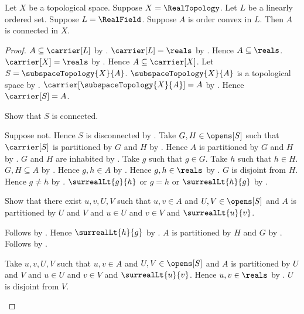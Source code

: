 \begin{theorem}\label{real_order_convex_set_is_connected}
    Let $X$ be a topological space.
    Suppose $X=\RealTopology$.
    Let $L$ be a linearly ordered set.
    Suppose $L=\RealField$.
    Suppose $A$ is order convex in $L$.
    Then $A$ is connected in $X$.
\end{theorem}
\begin{proof}
    $A\subseteq\carrier[L]$ by .
    $\carrier[L]=\reals$ by
        .
    Hence $A\subseteq\reals$.
    $\carrier[X]=\reals$ by .
    Hence $A\subseteq\carrier[X]$.
    Let $S=\subspaceTopology{X}{A}$.
    $\subspaceTopology{X}{A}$ is a topological space by
        .
    $\carrier[\subspaceTopology{X}{A}]=A$ by
        .
    Hence $\carrier[S]=A$.

    Show that $S$ is connected.
    \begin{subproof}
        Suppose not.
        Hence $S$ is disconnected by .
        Take $G,H\in\opens[S]$ such that
            $\carrier[S]$ is partitioned by $G$ and $H$ by
            .
        Hence $A$ is partitioned by $G$ and $H$ by \auto.
        $G$ and $H$ are inhabited by
            .
        Take $g$ such that $g\in G$.
        Take $h$ such that $h\in H$.
        $G,H\subseteq A$ by
            .
        Hence $g,h\in A$ by .
        Hence $g,h\in\reals$ by .
        $G$ is disjoint from $H$.
        Hence $g\neq h$ by .
        $\surrealLt{g}{h}$ or $g=h$ or $\surrealLt{h}{g}$ by
            .

        Show that there exist $u,v,U,V$ such that
            $u,v\in A$ and $U,V\in\opens[S]$ and
            $A$ is partitioned by $U$ and $V$ and
            $u\in U$ and $v\in V$ and $\surrealLt{u}{v}$.
        \begin{subproof}
            \begin{byCase}
                Follows by \auto.
                Hence $\surrealLt{h}{g}$ by \auto.
                $A$ is partitioned by $H$ and $G$ by
                    .
                Follows by \auto.
            \end{byCase}
        \end{subproof}
        Take $u,v,U,V$ such that
            $u,v\in A$ and $U,V\in\opens[S]$ and
            $A$ is partitioned by $U$ and $V$ and
            $u\in U$ and $v\in V$ and $\surrealLt{u}{v}$.
        Hence $u,v\in\reals$ by .
        $U$ is disjoint from $V$.


\end{subproof}
\end{proof}
